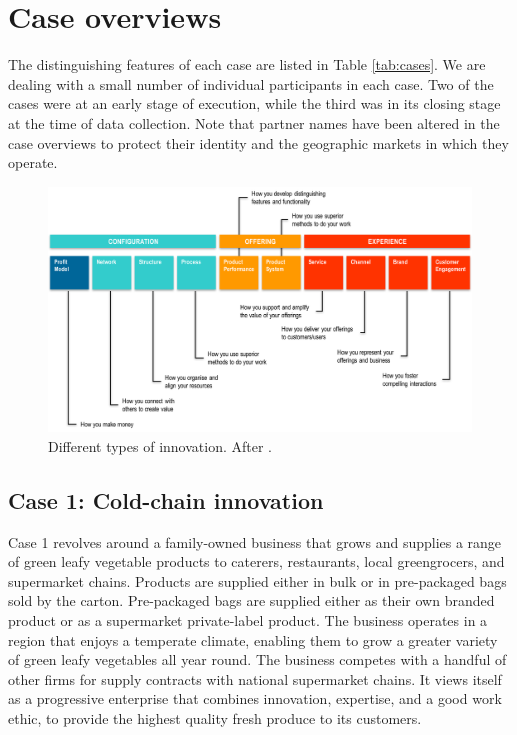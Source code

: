 \section{Case overviews}

The distinguishing features of each case are listed in Table \ref{tab:cases}. We are dealing with a small number of individual participants in each case. Two of the cases were at an early stage of execution, while the third was in its closing stage at the time of data collection. Note that partner names have been altered in the case overviews to protect their identity and the geographic markets in which they operate. 

\begin{figure}
\centering
\includegraphics[width = \textwidth]{Images/innovation_types.png}
\caption{Different types of innovation. After \citet{keeley2013ten}.}
\label{fig:innov_type}
\end{figure}

\subsection{Case 1: Cold-chain innovation}

Case 1 revolves around a family-owned business that grows and supplies a range of green leafy vegetable products to caterers, restaurants, local greengrocers, and supermarket chains. Products are supplied either in bulk or in pre-packaged bags sold by the carton. Pre-packaged bags are supplied either as their own branded product or as a supermarket private-label product. The business operates in a region that enjoys a temperate climate, enabling them to grow a greater variety of green leafy vegetables all year round. The business competes with a handful of other firms for supply contracts with national supermarket chains. It views itself as a progressive enterprise that combines innovation, expertise, and a good work ethic, to provide the highest quality fresh produce to its customers. \medskip

